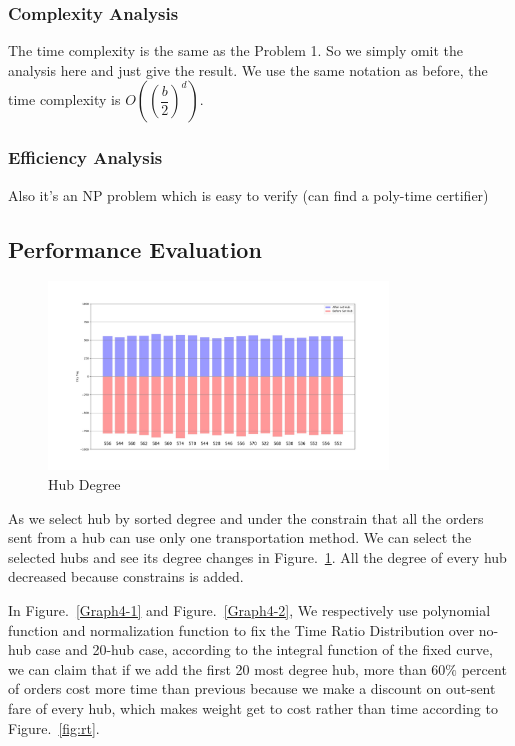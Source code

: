 \documentclass{llncs}
\begin{document}
\subsubsection{Complexity Analysis}
The time complexity is the same as the Problem 1. So we simply omit the analysis here and just give the result. We use the same notation as before, the time complexity is $O((\dfrac{b}{2})^d)$.
\subsubsection{Efficiency Analysis}
Also it's an NP problem which is easy to verify (can find a poly-time certifier)
\subsection{Performance Evaluation}

\begin{figure}[htbp]
  \centering
  \includegraphics[height = 5cm]{graph/DegreeChange.jpg}
  \caption{Hub Degree}
  \label{bargraph0}
\end{figure}

As we select hub by sorted degree and under the constrain that all the orders sent from a hub can use only one transportation method. We can select the selected hubs and see its degree changes in Figure.~\ref{bargraph0}. All the degree of every hub decreased because constrains is added.\par

In Figure.~\ref{Graph4-1} and Figure.~\ref{Graph4-2}, We respectively use polynomial function and normalization function to fix the Time Ratio Distribution over no-hub case and 20-hub case, according to the integral function of the fixed curve, we can claim that if we add the first 20 most degree hub, more than $60\%$ percent of orders cost more time than previous because we make a discount on out-sent fare of every hub, which makes weight get to cost rather than time according to Figure.~\ref{fig:rt}.\par
\end{document}
